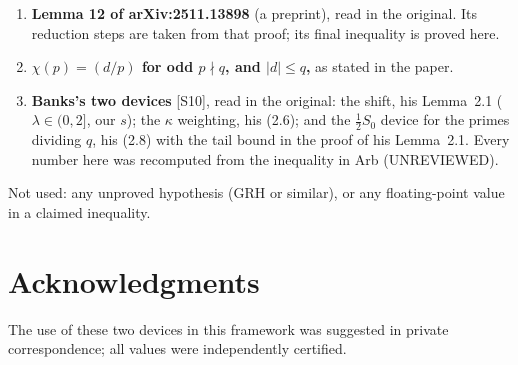 \documentclass[11pt]{article}
\begin{document}
\begin{enumerate}
\item \textbf{Lemma 12 of arXiv:2511.13898} (a preprint), read in the original. Its reduction steps are taken from that proof; its final inequality is proved here.
\item \textbf{$\chi(p)=(d/p)$ for odd $p\nmid q$, and $|d|\le q$,} as stated in the paper.
\item \textbf{Banks's two devices} [S10], read in the original: the shift, his Lemma~2.1 ($\lambda\in(0,2]$, our $s$); the $\kappa$ weighting, his (2.6); and the $\frac12S_0$ device for the primes dividing $q$, his (2.8) with the tail bound in the proof of his Lemma~2.1. Every number here was recomputed from the inequality in Arb (UNREVIEWED).
\end{enumerate}
Not used: any unproved hypothesis (GRH or similar), or any floating-point value in a claimed inequality.

\section*{Acknowledgments}
The use of these two devices in this framework was suggested in private correspondence; all values were independently certified.
\end{document}
